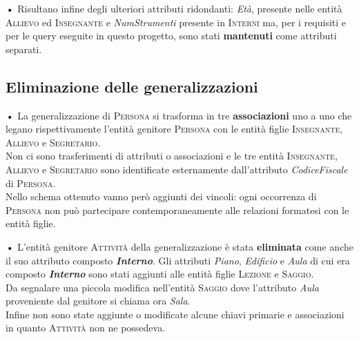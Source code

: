 \documentclass{article}
\begin{document}
\bigskip

\begin{flushleft}
\textbf{•} Risultano infine degli ulteriori attributi ridondanti: \emph{Età}, presente nelle entità \textsc{Allievo} ed \textsc{Insegnante} e \emph{NumStrumenti} presente in \textsc{Interni} ma, per i requisiti e per le query eseguite in questo progetto, sono stati \textbf{mantenuti} come attributi separati.
\end{flushleft}

\bigskip

\subsection{Eliminazione delle generalizzazioni}\medskip

\textbf{•} La generalizzazione di \textsc{Persona} si trasforma in tre \textbf{associazioni} uno a uno che legano rispettivamente l'entità genitore \textsc{Persona} con le entità figlie \textsc{Insegnante}, \textsc{Allievo} e \textsc{Segretario}.\\
Non ci sono trasferimenti di attributi o associazioni e le tre entità \textsc{Insegnante}, \textsc{Allievo} e \textsc{Segretario}
sono identificate esternamente dall'attributo \emph{CodiceFiscale} di \textsc{Persona}.\\
Nello schema ottenuto vanno però aggiunti dei vincoli: ogni occorrenza di \textsc{Persona} non può partecipare contemporaneamente
alle relazioni formatesi con le entità figlie.

\bigskip

\begin{flushleft}
\textbf{•} L'entità genitore \textsc{Attività} della generalizzazione è stata \textbf{eliminata} come anche il suo attributo composto \emph{\textbf{Interno}}.
Gli attributi \emph{Piano}, \emph{Edificio} e \emph{Aula} di cui era composto \emph{\textbf{Interno}} sono stati aggiunti alle entità figlie \textsc{Lezione} e \textsc{Saggio}.\smallskip
\\Da segnalare una piccola modifica nell'entità \textsc{Saggio} dove l'attributo \emph{Aula} proveniente dal genitore si chiama ora \emph{Sala}.\smallskip
\\Infine non sono state aggiunte o modificate alcune chiavi primarie e associazioni in quanto \textsc{Attività} non ne possedeva.
\end{flushleft}

\bigskip
\end{document}
